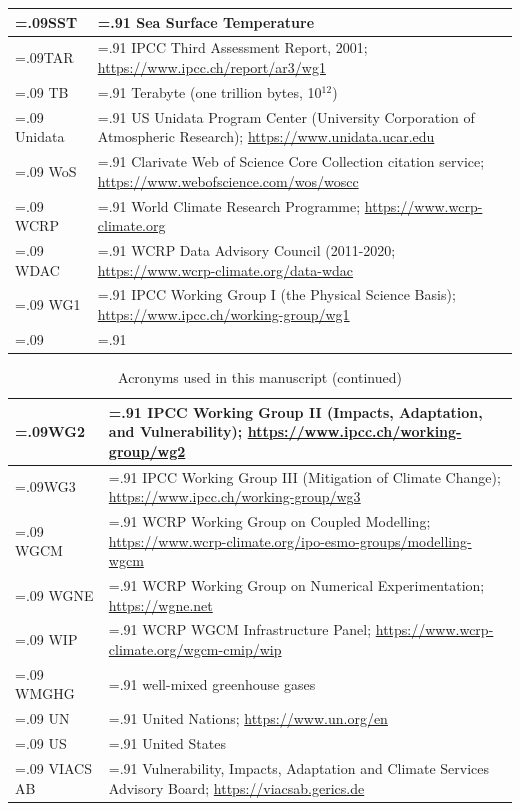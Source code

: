 \documentclass[manuscript]{copernicus}
\begin{document}
\begin{table}[htp]
{\begin{tabularx}{1\textwidth} { 
	  | >{\raggedright\arraybackslash\hsize=.09\hsize}X
	  | >{\centering\arraybackslash\hsize=.91\hsize}X | }
SST & Sea Surface Temperature\\ \hline
TAR & IPCC Third Assessment Report, 2001; \url{https://www.ipcc.ch/report/ar3/wg1}\\ \hline
TB & Terabyte (one trillion bytes, 10$^{12}$)\\ \hline
Unidata & US Unidata Program Center (University Corporation of Atmospheric Research); \url{https://www.unidata.ucar.edu}\\ \hline 
WoS & Clarivate Web of Science Core Collection citation service; \url{https://www.webofscience.com/wos/woscc}\\ \hline
WCRP & World Climate Research Programme; \url{https://www.wcrp-climate.org}\\ \hline
WDAC & WCRP Data Advisory Council (2011-2020; \url{https://www.wcrp-climate.org/data-wdac}\\ \hline
WG1 & IPCC Working Group I (the Physical Science Basis); \url{https://www.ipcc.ch/working-group/wg1}\\ \hline
\multicolumn{2}{l}{\textbf{\autoref{tab:tabAppG1-Acronyms} continued overpage..}}\\
\end{tabularx}
} %
\end{table}

\addtocounter{table}{-1}
\begin{table}[htp]
\renewcommand{\arraystretch}{2}
\scriptsize
\centering
\caption{Acronyms used in this manuscript (continued)}
\resizebox{\textwidth}{!} {
	\begin{tabularx}{1\textwidth} { 
	  | >{\raggedright\arraybackslash\hsize=.09\hsize}X
	  | >{\centering\arraybackslash\hsize=.91\hsize}X | }
\hline
WG2 & IPCC Working Group II (Impacts, Adaptation, and Vulnerability); \url{https://www.ipcc.ch/working-group/wg2}\\ \hline
WG3 & IPCC Working Group III (Mitigation of Climate Change); \url{https://www.ipcc.ch/working-group/wg3}\\ \hline
WGCM & WCRP Working Group on Coupled Modelling; \url{https://www.wcrp-climate.org/ipo-esmo-groups/modelling-wgcm}\\ \hline
WGNE & WCRP Working Group on Numerical Experimentation; \url{https://wgne.net}\\ \hline
WIP & WCRP WGCM Infrastructure Panel; \url{https://www.wcrp-climate.org/wgcm-cmip/wip}\\ \hline
WMGHG & well-mixed greenhouse gases\\ \hline
UN & United Nations; \url{https://www.un.org/en}\\ \hline
US & United States\\ \hline
VIACS AB & Vulnerability, Impacts, Adaptation and Climate Services Advisory Board; \url{https://viacsab.gerics.de}\\ \hline
\end{tabularx}
} %
\label{tab:tabAppG1-Acronyms}
\footnotesize{}
\end{table}
\end{document}
